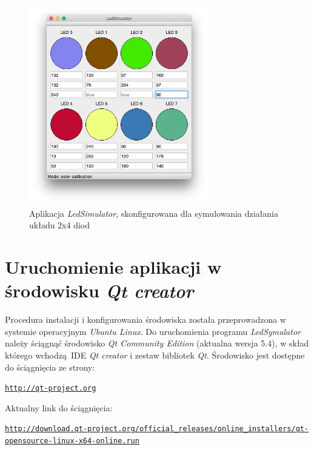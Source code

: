 \documentclass[eng,printmode]{mgr}
\begin{document}
\begin{figure}[!ht]
    \centering
    \includegraphics[width=0.7\textwidth]{Figures/ledSimulator3.png} 
    \caption{Aplikacja \emph{LedSimulator}, skonfigurowana dla symulowania działania układu 2x4 diod}
    \label{fig:ledSimulator3}
\end{figure}

\chapter{Uruchomienie aplikacji w środowisku \emph{Qt creator}}
Procedura instalacji i konfigurowania środowiska została przeprowadzona w systemie operacyjnym \emph{Ubuntu Linux}.
Do uruchomienia programu \emph{LedSymulator} należy ściągnąć środowisko \emph{Qt Community Edition} (aktualna wersja 5.4), w skład którego wchodzą IDE \emph{Qt creator} i zestaw bibliotek \emph{Qt}.
Środowisko jest dostępne do ściągnięcia ze strony:

\begin{alltt}
    \url{http://qt-project.org}
\end{alltt}

Aktualny link do ściągnięcia:

\begin{alltt}
    \url{http://download.qt-project.org/official_releases/online_installers/qt-opensource-linux-x64-online.run}
\end{alltt}




\listoffigures
\nocite{*}

\end{document}
